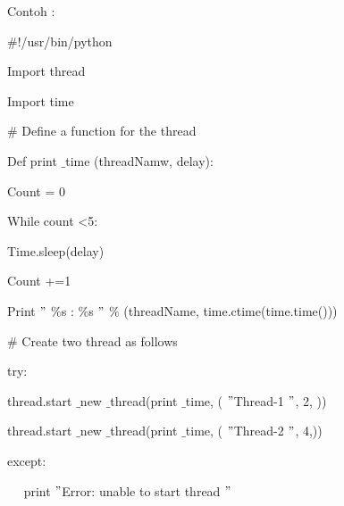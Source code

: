 \vspace{12pt}
\vspace{12pt}
\noindent 
Contoh : \par
\noindent 
{\fontsize{10pt}{10pt}\selectfont  $  \#  $!/usr/bin/python} \par
\vspace{10pt}
\noindent 
{\fontsize{10pt}{10pt}\selectfont Import thread} \par
\noindent 
{\fontsize{10pt}{10pt}\selectfont Import time} \par
\vspace{10pt}
\noindent 
{\fontsize{10pt}{10pt}\selectfont  $  \#  $ Define a function for the thread} \par
\noindent 
{\fontsize{10pt}{10pt}\selectfont Def print $  \_  $time (threadNamw, delay):} \par
\noindent 
{\fontsize{10pt}{10pt}\selectfont  \hspace*{0.5in} Count = 0} \par
\noindent 
{\fontsize{10pt}{10pt}\selectfont  \hspace*{0.5in} While count <5:} \par
\noindent 
{\fontsize{10pt}{10pt}\selectfont  \hspace*{0.5in} Time.sleep(delay)} \par
\noindent 
{\fontsize{10pt}{10pt}\selectfont  \hspace*{0.5in} Count +=1} \par
\noindent 
{\fontsize{10pt}{10pt}\selectfont  \hspace*{0.5in} Print  $ " $ $  \%  $s :  $  \%  $s $ " $  $  \%  $ (threadName, time.ctime(time.time()))} \par
\vspace{10pt}
\noindent 
{\fontsize{10pt}{10pt}\selectfont  $  \#  $ Create two thread as follows} \par
\noindent 
{\fontsize{10pt}{10pt}\selectfont try:} \par
\noindent 
{\fontsize{10pt}{10pt}\selectfont  thread.start $  \_  $new $  \_  $thread(print $  \_  $time, ( $ " $Thread-1 $ " $, 2, ))} \par
\noindent 
{\fontsize{10pt}{10pt}\selectfont  thread.start $  \_  $new $  \_  $thread(print $  \_  $time, ( $ " $Thread-2 $ " $, 4,))} \par
\noindent 
{\fontsize{10pt}{10pt}\selectfont except:} \par
\noindent 
{\fontsize{10pt}{10pt}\selectfont ~~ print  $ " $Error: unable to start thread $ " $} \par

